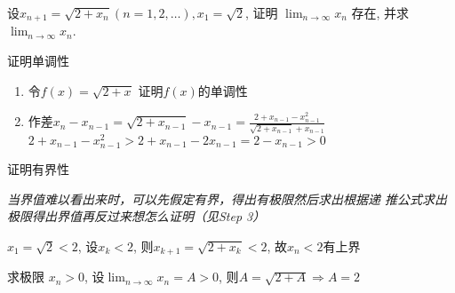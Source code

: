 \documentclass{ctexart}
\begin{document}
\begin{ques}[date=2020-8-20]
  设$x_{n + 1} = \sqrt{2 + x_n} (n = 1, 2, \dotsc), x_1 = \sqrt{2}$, 证明
  $\lim_{n \to \infty} x_n$ 存在, 并求$\lim_{n \to \infty} x_n$.
  \begin{solution}
    \begin{step}{证明单调性}
      \begin{enumerate}
        \item 令$f(x) = \sqrt{2 + x}$ 证明$f(x)$的单调性
        \item 作差$x_{n} - x_{n - 1} = \sqrt{2 + x_{n - 1}} - x_{n - 1} = \frac{2
          + x_{n - 1} - x_{n - 1}^2}{\sqrt{2 + x_{n - 1}} + x_{n - 1}}$\\
          $2 + x_{n - 1} - x_{n - 1}^2 > 2 + x_{n - 1} - 2x_{n - 1} = 2 - x_{n
          - 1} > 0$
      \end{enumerate}
    \end{step}
    \begin{step}{证明有界性}
      \begin{ideabox}
        \itshape 当界值难以看出来时，可以先假定有界，得出有极限然后求出根据递
        推公式求出极限得出界值再反过来想怎么证明（见Step 3）
      \end{ideabox}
      $x_1 = \sqrt{2} < 2$, 设$x_k < 2$, 则$x_{k + 1} = \sqrt{2 + x_k} < 2$,
      故$x_n < 2$有上界
    \end{step}
    \begin{step}{求极限}
      $x_n > 0$, 设$\lim_{n \to \infty} x_n = A > 0$, 则$A = \sqrt{2 + A} \Rightarrow A = 2$
    \end{step}
  \end{solution}
\end{ques}
\end{document}
